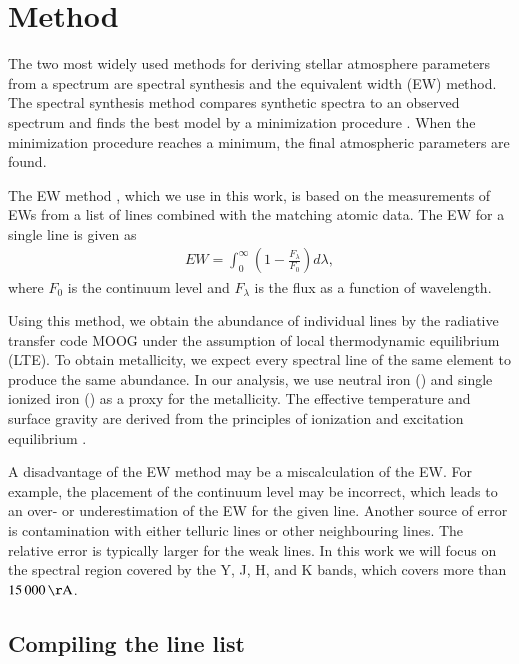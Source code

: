 \documentclass{aa}
\begin{document}
\section{Method}
\label{sec:method}

The two most widely used methods for deriving stellar atmosphere
parameters from a spectrum are spectral synthesis and the equivalent width (EW) method.
The spectral synthesis method compares synthetic spectra to an observed
spectrum and finds the best model by a minimization procedure
\citep[see e.g.][]{Valenti2005,Onehag2012,Blanco2014}. When the minimization
procedure reaches a minimum, the final atmospheric parameters are found.

The EW method
\citep[see e.g.][]{Sousa2008a,Mucciarelli2013,Bensby2014}, which we use
in this work, is based on the measurements of EWs from a list of lines
combined with the matching atomic data. The EW for a single line is
given as
\begin{align}
    \label{eq:EW}
    EW = \int_0^\infty \left(1 - \frac{F_\lambda}{F_0}\right) d\lambda,
\end{align}
where $F_0$ is the continuum level and $F_\lambda$ is the flux as a
function of wavelength.

Using this method, we obtain the abundance of individual lines by
the radiative transfer code MOOG \citep[][version 2013]{Sneden1973}
under the assumption of local thermodynamic equilibrium (LTE). To
obtain metallicity, we expect every spectral line of the same element
to produce the same abundance. In our analysis, we use neutral iron
() and single ionized iron () as a proxy for
the metallicity. The effective temperature and surface gravity are
derived from the principles of ionization and excitation equilibrium
\citep[see][]{Gray2006}.


A disadvantage of the EW method may be a miscalculation of the EW. For
example, the placement of the continuum level may be incorrect, which
leads to an over- or underestimation of the EW for the given line.
Another source of error is contamination with either telluric lines or
other neighbouring lines. The relative error is typically larger for the
weak lines. In this work we will focus on the spectral region covered by
the Y, J, H, and K bands, which covers more than $\SI{15000}{\AA}$.



\subsection{Compiling the line list}
\end{document}
